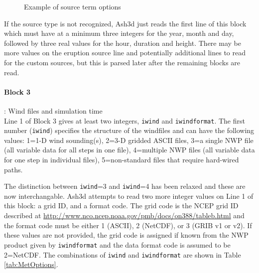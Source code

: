 \begin{figure}[htbp]
\parbox{15cm}{\caption{\label{FigSourceOptions}
Example of source term options}}
\end{figure}
If the source type is not recognized, Ash3d just reads the first line of this
block which must have at a minimum three integers for the year, month and day,
followed by three real values for the hour, duration and height.  There may
be more values on the eruption source line and potentially additional lines to
read for the custom sources, but this is parsed later after the remaining blocks
are read.

\paragraph{Block 3}: Wind files and simulation time\\
Line 1 of Block 3 gives at least two integers, \texttt{iwind} and \texttt{iwindformat}.
The first number (\texttt{iwind}) specifies the structure of the windfiles and can
have the following values:
1=1-D wind sounding(s),
2=3-D gridded ASCII files,
3=a single NWP file (all variable data for all steps in one file),
4=multiple NWP files (all variable data for one step in individual files),
5=non-standard files that require hard-wired paths.

The distinction between \texttt{iwind}=3 and \texttt{iwind}=4 has been
relaxed and these are now interchangable.
Ash3d attempts to read two more integer values on Line 1
of this block: a grid ID, and a format code.  The grid code is the NCEP grid
ID described at \url{http://www.nco.ncep.noaa.gov/pmb/docs/on388/tableb.html}
and the format code must be either 1 (ASCII), 2 (NetCDF), or 3 (GRIB v1 or v2).
If these values are not provided, the grid code is assigned if known from the
NWP product given by \texttt{iwindformat} and the data format code is assumed to
be 2=NetCDF.  The combinations of \texttt{iwind} and \texttt{iwindformat} are shown in
Table \ref{tab:MetOptions}.

